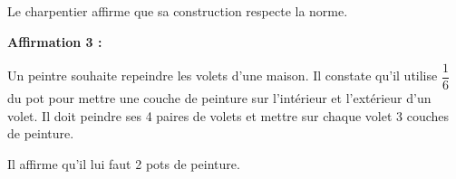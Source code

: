 Le charpentier affirme que sa construction respecte la norme.\\


\medskip

\textbf{Affirmation 3 : }

 Un peintre souhaite repeindre les volets d'une maison. Il constate qu'il utilise $\dfrac{1}{6}$ du pot pour mettre une couche de peinture sur l'intérieur et l'extérieur d'un volet. Il doit peindre ses 4 paires de volets et mettre sur chaque volet 3 couches de peinture. 

 Il affirme qu'il lui faut 2 pots de peinture.

\bigskip

